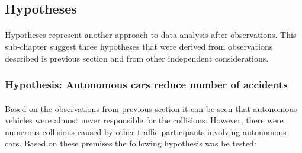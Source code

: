 \documentclass[11pt,english,twoside]{article}
\begin{document}


















\subsection{Hypotheses}
\paragraph{}

Hypotheses represent another approach to data analysis after observations. This sub-chapter suggest three hypotheses that were derived from observations described is previous section and from other independent considerations.



\subsubsection{Hypothesis: Autonomous cars reduce number of accidents}
\paragraph{}

Based on the observations from previous section it can be seen that autonomous vehicles were almost never responsible for the collisions. However, there were numerous collisions caused by other traffic participants involving autonomous cars. Based on these premises the following hypothesis was be tested:
\end{document}
